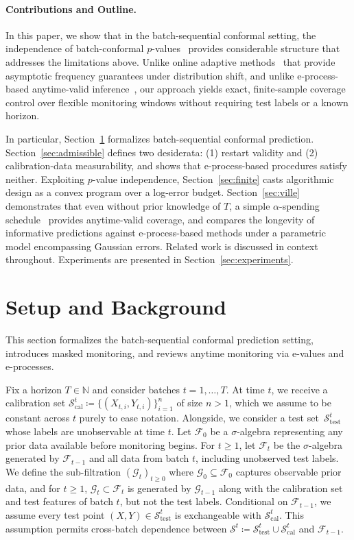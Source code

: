 \documentclass{uai2026} %
\newcommand{\N}{\mathbb{N}}
\newcommand{\1}{\mathbf{1}}
\newcommand{\test}{\mathrm{test}}
\newcommand{\scal}{\mathcal{S}}
\newcommand{\eqdef}{\coloneqq}
\newcommand{\F}{\mathcal{F}}
\newcommand{\G}{\mathcal{G}}
\newcommand{\cali}{\mathrm{cal}}
\newcommand{\scalcal}{\scal_{\cali}}
\newcommand{\scaltest}{\scal_{\test}}
\begin{document}
\paragraph{Contributions and Outline.} In this paper, we show that in the batch-sequential conformal setting, the independence of batch-conformal $p$-values~\citep{papadopoulos2002inductive} provides considerable structure that addresses the limitations above.
Unlike online adaptive methods~\citep{gibbs2021adaptive,gibbs2024conformal} that provide asymptotic frequency guarantees under distribution shift, and unlike e-process-based anytime-valid inference~\citep{grunwald2020safe,ramdas2023game,gauthier2025values}, our approach yields exact, finite-sample coverage control over flexible monitoring windows without requiring test labels or a known horizon.

In particular, Section~\ref{sec:setup} formalizes batch-sequential conformal prediction. Section~\ref{sec:admissible} defines two desiderata: (1) restart validity and (2) calibration-data measurability, and shows that e-process-based procedures satisfy neither.
Exploiting $p$-value independence, Section~\ref{sec:finite} casts algorithmic design as a convex program over a log-error budget. Section~\ref{sec:ville} demonstrates that even without prior knowledge of $T$, a simple $\alpha$-spending schedule~\citep{lan1983discrete} provides anytime-valid coverage, and compares the longevity of informative predictions against e-process-based methods under a parametric model encompassing Gaussian errors. Related work is discussed in context throughout. Experiments are presented in Section~\ref{sec:experiments}.

\section{Setup and Background}
\label{sec:setup}
\label{sec:batch}

This section formalizes the batch-sequential conformal prediction setting, introduces masked monitoring, and reviews anytime monitoring via e-values and e-processes.

Fix a horizon $T\in\N$ and consider batches $t=1,\dots,T$. At time $t$, we receive a calibration set $\scalcal^t \coloneqq \{(X_{t,i},Y_{t,i})\}_{i=1}^n$ of size $n>1$, which we assume to be constant across $t$ purely to ease notation. Alongside, we consider a test set~$\scaltest^t$ whose labels are unobservable at time $t$. Let $\F_0$ be a $\sigma$-algebra representing any prior data available before monitoring begins. For $t\ge 1$, let $\F_t$ be the $\sigma$-algebra generated by $\F_{t-1}$ and all data from batch $t$, including unobserved test labels. We define the sub-filtration $(\G_t)_{t\ge 0}$ where $\G_0 \subseteq \F_0$ captures observable prior data, and for $t \ge 1$, $\G_t \subset \F_t$ is generated by $\G_{t-1}$ along with the calibration set and test features of batch $t$, but not the test labels. Conditional on $\F_{t-1}$, we assume every test point $(X, Y) \in \scaltest^t$ is exchangeable with $\scalcal^t$. This assumption permits cross-batch dependence between $\scal^t \eqdef \scaltest^t \cup \scalcal^t$ and $\F_{t-1}$.
\end{document}

